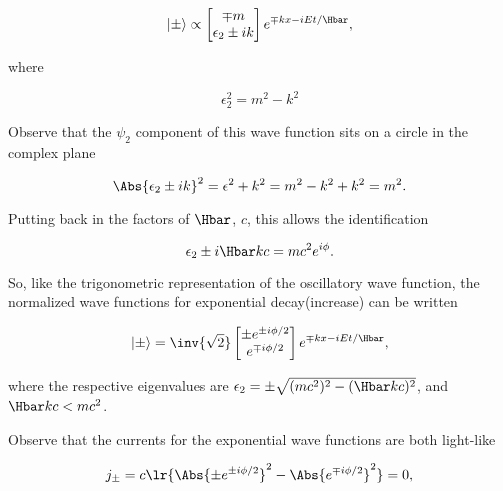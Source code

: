 \begin{enumerate}[(i)]
\begin{dmath}\label{eqn:gradQuantumProblemSet4Problem3:1061}
\ket{\pm} \propto
\begin{bmatrix}
\mp m \\
\epsilon_2 \pm i k
\end{bmatrix}
e^{\mp k x - i E t/\Hbar},
\end{dmath}

where 

\begin{dmath}\label{eqn:gradQuantumProblemSet4Problem3:1081}
\epsilon_2^2 = m^2 - k^2
\end{dmath}

Observe that the \( \psi_2 \) component of this wave function sits on a circle in the complex plane

\begin{dmath}\label{eqn:gradQuantumProblemSet4Problem3:1101}
\Abs{\epsilon_2 \pm i k}^2 
= \epsilon^2 + k^2 
= m^2 - k^2 + k^2 
= m^2.
\end{dmath}

Putting back in the factors of \( \Hbar \), \( c\), this allows the identification

\begin{dmath}\label{eqn:gradQuantumProblemSet4Problem3:1121}
\epsilon_2 \pm i \Hbar k c = m c^2 e^{i\phi}.
\end{dmath}

So, like the trigonometric representation of the oscillatory wave function, the normalized wave functions for exponential decay(increase) can be written

\begin{dmath}\label{eqn:gradQuantumProblemSet4Problem3:1141}
\ket{\pm}
=
\inv{\sqrt{2}}
\begin{bmatrix}
\pm e^{\pm i \phi/2} \\
e^{\mp i \phi/2}
\end{bmatrix}
e^{\mp k x - i E t/\Hbar}
,
\end{dmath}

where the respective eigenvalues are \( \epsilon_2 = \pm \sqrt{ (m c^2)^2 - (\Hbar k c)^2} \), and \( \Hbar k c < m c^2 \).

Observe that the currents for the exponential wave functions are both light-like

\begin{equation}\label{eqn:gradQuantumProblemSet4Problem3:1161}
j_{\pm} = c \lr{ \Abs{\pm e^{\pm i \phi/2}}^2 - \Abs{e^{\mp i \phi/2}}^2 } = 0,
\end{equation}


\end{enumerate}
